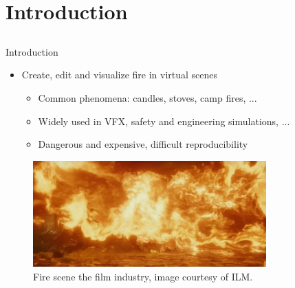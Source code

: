 \documentclass{beamer}
\begin{document}
\section{Introduction}
\subsection{ }

\begin{frame}{Introduction}

\begin{itemize}
\setlength\itemsep{0.5em}
\item Create, edit and visualize fire in virtual scenes
		\begin{itemize}
		\setlength\itemsep{0.5em}
		\item Common phenomena: candles, stoves, camp fires, ...
		\item Widely used in VFX, safety and engineering simulations, ...
		\item Dangerous and expensive, difficult reproducibility
		\end{itemize}
\end{itemize}

\begin{figure}[t!]
\begin{center}
\includegraphics[width=0.8\textwidth]{img/harry_potter_fire} 
\caption*{\tiny{Fire scene the film industry, image courtesy of ILM\footnotemark[1].}}
\end{center}
\end{figure}

\end{frame}
\end{document}
